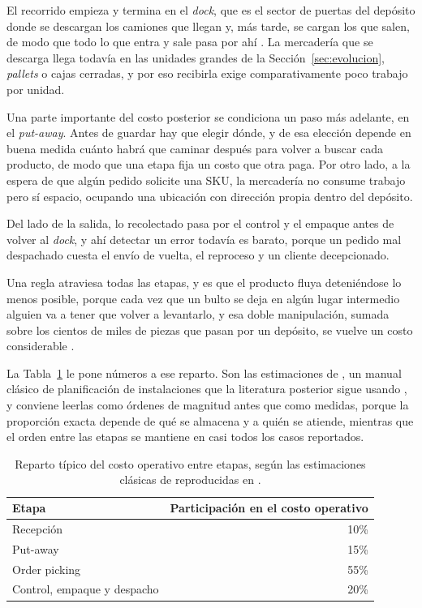 El recorrido empieza y termina en el \emph{dock}, que es el sector de puertas del depósito donde se descargan los camiones que llegan y, más tarde, se cargan los que salen, de modo que todo lo que entra y sale pasa por ahí \citep[capítulo~3]{bartholdi2014warehouse}.
La mercadería que se descarga llega todavía en las unidades grandes de la Sección~\ref{sec:evolucion}, \emph{pallets} o cajas cerradas, y por eso recibirla exige comparativamente poco trabajo por unidad.

Una parte importante del costo posterior se condiciona un paso más adelante, en el \emph{put-away}.
Antes de guardar hay que elegir dónde, y de esa elección depende en buena medida cuánto habrá que caminar después para volver a buscar cada producto, de modo que una etapa fija un costo que otra paga.
Por otro lado, a la espera de que algún pedido solicite una SKU, la mercadería no consume trabajo pero sí espacio, ocupando una ubicación con dirección propia dentro del depósito.

Del lado de la salida, lo recolectado pasa por el control y el empaque antes de volver al \emph{dock}, y ahí detectar un error todavía es barato, porque un pedido mal despachado cuesta el envío de vuelta, el reproceso y un cliente decepcionado.

Una regla atraviesa todas las etapas, y es que el producto fluya deteniéndose lo menos posible, porque cada vez que un bulto se deja en algún lugar intermedio alguien va a tener que volver a levantarlo, y esa doble manipulación, sumada sobre los cientos de miles de piezas que pasan por un depósito, se vuelve un costo considerable \citep[sección~2.1]{bartholdi2014warehouse}.

La Tabla~\ref{tab:costos-etapas} le pone números a ese reparto.
Son las estimaciones de \citet{tompkins2010facilities}, un manual clásico de planificación de instalaciones que la literatura posterior sigue usando \citep{dekoster2007design}, y conviene leerlas como órdenes de magnitud antes que como medidas, porque la proporción exacta depende de qué se almacena y a quién se atiende, mientras que el orden entre las etapas se mantiene en casi todos los casos reportados.

\begin{table}[htbp]
    \centering
    \begin{tabular}{|l|r|}
        \hline
        \textbf{Etapa} & \textbf{Participación en el costo operativo} \\
        \hline
        Recepción & 10\% \\
        \hline
        Put-away & 15\% \\
        \hline
        Order picking & 55\% \\
        \hline
        Control, empaque y despacho & 20\% \\
        \hline
    \end{tabular}
    \caption{Reparto típico del costo operativo entre etapas, según las estimaciones clásicas de \citet{tompkins2010facilities} reproducidas en \citet[capítulo~3]{bartholdi2014warehouse}.}
    \label{tab:costos-etapas}
\end{table}

